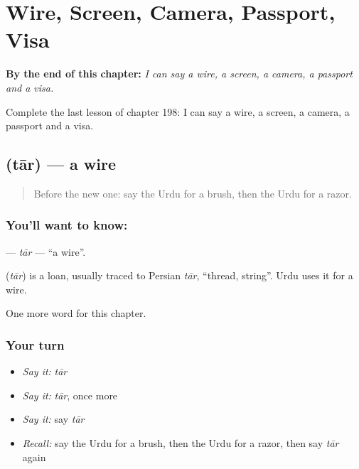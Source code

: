 
\chapter{Wire, Screen, Camera, Passport, Visa}
\label{ch:ur-wire-screen-camera-passport-visa}

\begin{chapteropening}
\textbf{By the end of this chapter:} \emph{I can say a wire, a screen, a camera, a passport and a visa.}

Complete the last lesson of chapter 198: I can say a wire, a screen, a camera, a passport and a visa.
\end{chapteropening}

\section[\texorpdfstring{\ur{تار} (tār)}{تار (tār)}]{ (tār) — a wire}

\label{lesson:UR-C198-tar}



\begin{quote}
Before the new one: say the Urdu for a brush, then the Urdu for a razor.
\end{quote}

\subsection*{You'll want to know: }
\textbf{} — \emph{tār} — \textquotedblleft{}a wire\textquotedblright{}.

\begin{cousinweb}
\textbf{} (\emph{tār}) is a loan, usually traced to Persian \emph{tār}, \textquotedblleft{}thread, string\textquotedblright{}. Urdu uses it for a wire.
\end{cousinweb}

\begin{grammarlens}[title={What you've built}]
One more word for this chapter.
\end{grammarlens}

\subsection*{Your turn}
\begin{itemize}
\raggedright
  \item \emph{Say it:} \emph{tār}
  \item \emph{Say it:} \emph{tār}, once more
  \item \emph{Say it:} say \emph{tār}
  \item \emph{Recall:} say the Urdu for a brush, then the Urdu for a razor, then say \emph{tār} again
\end{itemize}

